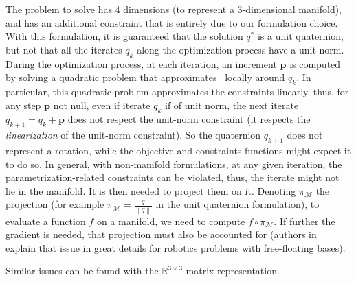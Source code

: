 The problem to solve has 4 dimensions (to represent a 3-dimensional manifold), and has an additional constraint that is entirely due to our formulation choice.
With this formulation, it is guaranteed that the solution $q^*$ is a unit quaternion, but not that all the iterates $q_k$ along the optimization process have a unit norm.
During the optimization process, at each iteration, an increment $\mathbf{p}$ is computed by solving a quadratic problem that approximates~ locally around $q_k$.
In particular, this quadratic problem approximates the constraints linearly, thus, for any step $\mathbf{p}$ not null, even if iterate $q_k$ if of unit norm, the next iterate $q_{k+1} = q_k + \mathbf{p}$ does not respect the unit-norm constraint (it respects the \emph{linearization} of the unit-norm constraint).
So the quaternion $q_{k+1}$ does not represent a rotation, while the objective and constraints functions might expect it to do so.
In general, with non-manifold formulations, at any given iteration, the parametrization-related constraints can be violated, thus, the iterate might not lie in the manifold.
It is then needed to project them on it.
Denoting $\pi_\mathcal{M}$ the projection (for example $\pi_\mathcal{M} = \frac{q}{\left\|q\right\|}$ in the unit quaternion formulation), to evaluate a function $f$ on a manifold, we need to compute $f \circ \pi_\mathcal{M}$.
If further the gradient is needed, that projection must also be accounted for (authors in~\cite{bouyarmane:humanoids:2012} explain that issue in great details for robotics problems with free-floating bases).

Similar issues can be found with the $\mathbb{R}^{3\times 3}$ matrix representation.

